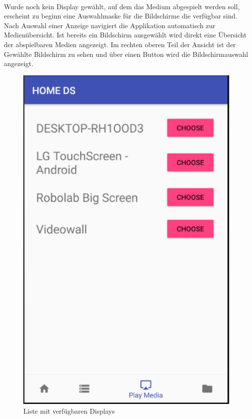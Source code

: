 \\
Wurde noch kein Display gewählt, auf dem das Medium abgespielt werden soll, erscheint zu beginn eine Auswahlmaske für die Bildschirme die verfügbar sind. Nach Auswahl einer Anzeige navigiert die Applikation automatisch zur Medienübersicht. Ist bereits ein Bildschirm ausgewählt wird direkt eine Übersicht der abspielbaren Medien angezeigt. Im rechten oberen Teil der Ansicht ist der Gewählte Bildschirm zu sehen und über einen Button wird die Bildschirmauswahl angezeigt.
\\
\begin{figure}[H]
\centering
\includegraphics[width=1.0\textwidth]{images/06_AndroidApp/06_displayChoice}
\caption{Liste mit verfügbaren Displays}
\label{fig:mediaNav}
\end{figure}
